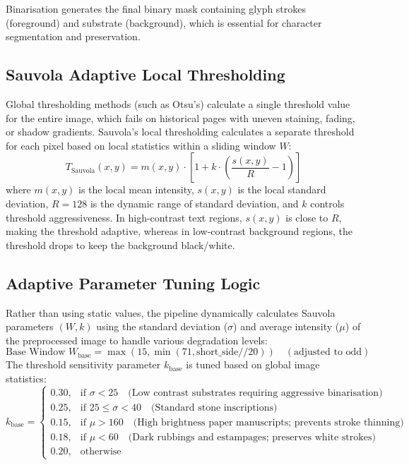 Binarisation generates the final binary mask containing glyph strokes (foreground) and substrate (background), which is essential for character segmentation and preservation.

\subsection{Sauvola Adaptive Local Thresholding}
Global thresholding methods (such as Otsu's) calculate a single threshold value for the entire image, which fails on historical pages with uneven staining, fading, or shadow gradients. Sauvola's local thresholding calculates a separate threshold for each pixel based on local statistics within a sliding window $W$:
\begin{equation}
T_{\text{Sauvola}}(x, y) = m(x, y) \cdot \left[ 1 + k \cdot \left( \frac{s(x, y)}{R} - 1 \right) \right]
\end{equation}
where $m(x,y)$ is the local mean intensity, $s(x,y)$ is the local standard deviation, $R = 128$ is the dynamic range of standard deviation, and $k$ controls threshold aggressiveness. In high-contrast text regions, $s(x,y)$ is close to $R$, making the threshold adaptive, whereas in low-contrast background regions, the threshold drops to keep the background black/white.

\subsection{Adaptive Parameter Tuning Logic}
Rather than using static values, the pipeline dynamically calculates Sauvola parameters $(W, k)$ using the standard deviation ($\sigma$) and average intensity ($\mu$) of the preprocessed image to handle various degradation levels:
\begin{equation}
\text{Base Window } W_{\text{base}} = \max\left(15, \min\left(71, \text{short\_side} // 20\right)\right) \quad (\text{adjusted to odd})
\end{equation}
The threshold sensitivity parameter $k_{\text{base}}$ is tuned based on global image statistics:
\begin{equation}
k_{\text{base}} = \begin{cases} 
0.30, & \text{if } \sigma < 25 \quad \text{(Low contrast substrates requiring aggressive binarisation)} \\
0.25, & \text{if } 25 \le \sigma < 40 \quad \text{(Standard stone inscriptions)} \\
0.15, & \text{if } \mu > 160 \quad \text{(High brightness paper manuscripts; prevents stroke thinning)} \\
0.18, & \text{if } \mu < 60 \quad \text{(Dark rubbings and estampages; preserves white strokes)} \\
0.20, & \text{otherwise}
\end{cases}
\end{equation}

